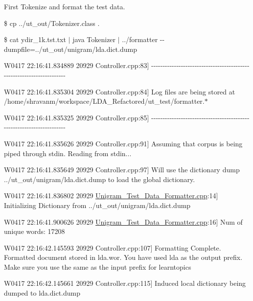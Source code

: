 {\ttfamily First Tokenize and format the test data. }

{\ttfamily \$ cp ../ut\_\-out/Tokenizer.class . }

{\ttfamily \$ cat ydir\_\-1k.tst.txt $|$ java Tokenizer $|$ ../formatter -\/-\/dumpfile=../ut\_\-out/unigram/lda.dict.dump }

{\ttfamily W0417 22:16:41.834889 20929 Controller.cpp:83\mbox{]} -\/-\/-\/-\/-\/-\/-\/-\/-\/-\/-\/-\/-\/-\/-\/-\/-\/-\/-\/-\/-\/-\/-\/-\/-\/-\/-\/-\/-\/-\/-\/-\/-\/-\/-\/-\/-\/-\/-\/-\/-\/-\/-\/-\/-\/-\/-\/-\/-\/-\/-\/-\/-\/-\/-\/-\/-\/-\/-\/-\/-\/-\/-\/-\/-\/-\/-\/-\/-\/-\/}

{\ttfamily   }

{\ttfamily W0417 22:16:41.835304 20929 Controller.cpp:84\mbox{]} Log files are being stored at /home/shravanm/workspace/LDA\_\-Refactored/ut\_\-test/formatter.$\ast$  }

{\ttfamily W0417 22:16:41.835325 20929 Controller.cpp:85\mbox{]} -\/-\/-\/-\/-\/-\/-\/-\/-\/-\/-\/-\/-\/-\/-\/-\/-\/-\/-\/-\/-\/-\/-\/-\/-\/-\/-\/-\/-\/-\/-\/-\/-\/-\/-\/-\/-\/-\/-\/-\/-\/-\/-\/-\/-\/-\/-\/-\/-\/-\/-\/-\/-\/-\/-\/-\/-\/-\/-\/-\/-\/-\/-\/-\/-\/-\/-\/-\/-\/-\/}

{\ttfamily   }

{\ttfamily W0417 22:16:41.835626 20929 Controller.cpp:91\mbox{]} Assuming that corpus is being piped through stdin. Reading from stdin...  }

{\ttfamily W0417 22:16:41.835649 20929 Controller.cpp:97\mbox{]} Will use the dictionary dump ../ut\_\-out/unigram/lda.dict.dump to load the global dictionary.  }

{\ttfamily W0417 22:16:41.836802 20929 \hyperlink{_unigram___test___data___formatter_8cpp}{Unigram\_\-Test\_\-Data\_\-Formatter.cpp}:14\mbox{]} Initializing Dictionary from ../ut\_\-out/unigram/lda.dict.dump  }

{\ttfamily W0417 22:16:41.900626 20929 \hyperlink{_unigram___test___data___formatter_8cpp}{Unigram\_\-Test\_\-Data\_\-Formatter.cpp}:16\mbox{]} Num of unique words: 17208  }

{\ttfamily W0417 22:16:42.145593 20929 Controller.cpp:107\mbox{]} Formatting Complete. Formatted document stored in lda.wor. You have used lda as the output prefix. Make sure you use the same as the input prefix for learntopics  }

{\ttfamily W0417 22:16:42.145661 20929 Controller.cpp:115\mbox{]} Induced local dictionary being dumped to lda.dict.dump  }

